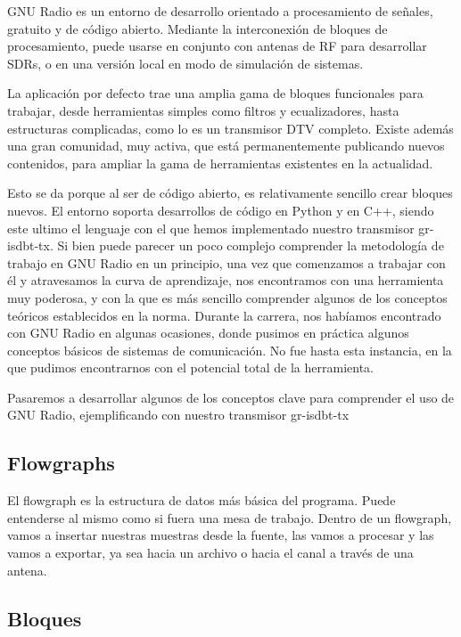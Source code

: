 GNU Radio es un entorno de desarrollo orientado a procesamiento de señales, gratuito y de código abierto. Mediante la interconexión de bloques de procesamiento, puede usarse en conjunto con antenas de RF para desarrollar SDRs, o en una versión local en modo de simulación de sistemas.
 
La aplicación por defecto trae una amplia gama de bloques funcionales para trabajar, desde herramientas simples como filtros y ecualizadores, hasta estructuras complicadas, como lo es un transmisor DTV completo.  Existe además una gran comunidad, muy activa, que está permanentemente publicando nuevos contenidos, para ampliar la gama de herramientas existentes en la actualidad. 

Esto se da porque al ser de código abierto, es relativamente sencillo crear bloques nuevos. El entorno soporta desarrollos de código en Python y en C++, siendo este ultimo el lenguaje con el que hemos implementado nuestro transmisor gr-isdbt-tx. Si bien puede parecer un poco complejo comprender la metodología de trabajo en GNU Radio en un principio,  una vez que comenzamos a trabajar con él y atravesamos la curva de aprendizaje, nos encontramos con una herramienta muy poderosa, y con la que es más sencillo comprender algunos de los conceptos teóricos establecidos en la norma.
Durante la carrera, nos habíamos encontrado con GNU Radio en algunas ocasiones, donde pusimos en práctica algunos conceptos básicos de sistemas de comunicación. No fue hasta esta instancia, en la que pudimos encontrarnos con el potencial total de la herramienta. 

Pasaremos a desarrollar algunos de los conceptos clave para comprender el uso de GNU Radio, ejemplificando con nuestro transmisor gr-isdbt-tx

\subsection{Flowgraphs}

El flowgraph es la estructura de datos más básica del programa. Puede entenderse al mismo como si fuera una mesa de trabajo. Dentro de un flowgraph, vamos a insertar nuestras muestras desde la fuente, las vamos a procesar y las vamos a exportar, ya sea hacia un archivo o hacia el canal a través de una antena. 

\subsection{Bloques}

